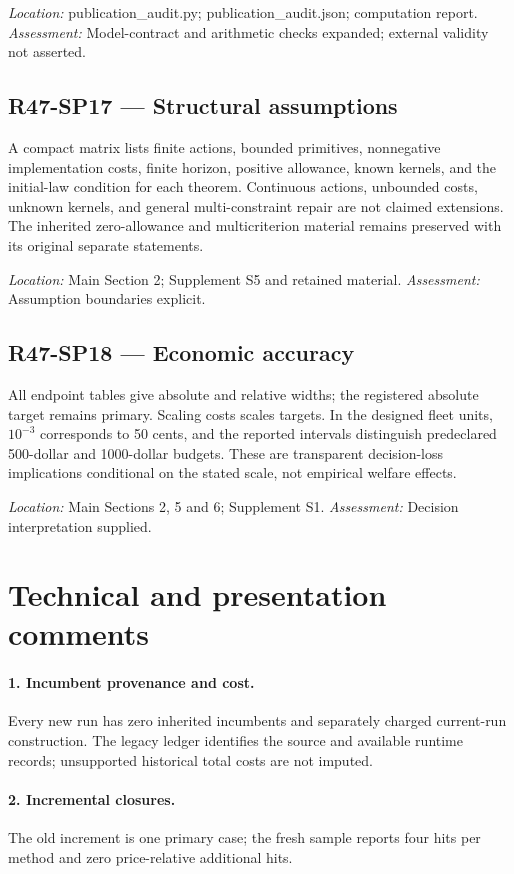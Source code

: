 \noindent\emph{Location:} publication\_audit.py; publication\_audit.json; computation report. \emph{Assessment:} Model-contract and arithmetic checks expanded; external validity not asserted.

\subsection{R47-SP17 --- Structural assumptions}
A compact matrix lists finite actions, bounded primitives, nonnegative implementation costs, finite horizon, positive allowance, known kernels, and the initial-law condition for each theorem. Continuous actions, unbounded costs, unknown kernels, and general multi-constraint repair are not claimed extensions. The inherited zero-allowance and multicriterion material remains preserved with its original separate statements.

\noindent\emph{Location:} Main Section 2; Supplement S5 and retained material. \emph{Assessment:} Assumption boundaries explicit.

\subsection{R47-SP18 --- Economic accuracy}
All endpoint tables give absolute and relative widths; the registered absolute target remains primary. Scaling costs scales targets. In the designed fleet units, $10^{-3}$ corresponds to 50 cents, and the reported intervals distinguish predeclared 500-dollar and 1000-dollar budgets. These are transparent decision-loss implications conditional on the stated scale, not empirical welfare effects.

\noindent\emph{Location:} Main Sections 2, 5 and 6; Supplement S1. \emph{Assessment:} Decision interpretation supplied.

\section{Technical and presentation comments}
\paragraph{1. Incumbent provenance and cost.} Every new run has zero inherited incumbents and separately charged current-run construction. The legacy ledger identifies the source and available runtime records; unsupported historical total costs are not imputed.

\paragraph{2. Incremental closures.} The old increment is one primary case; the fresh sample reports four hits per method and zero price-relative additional hits.

